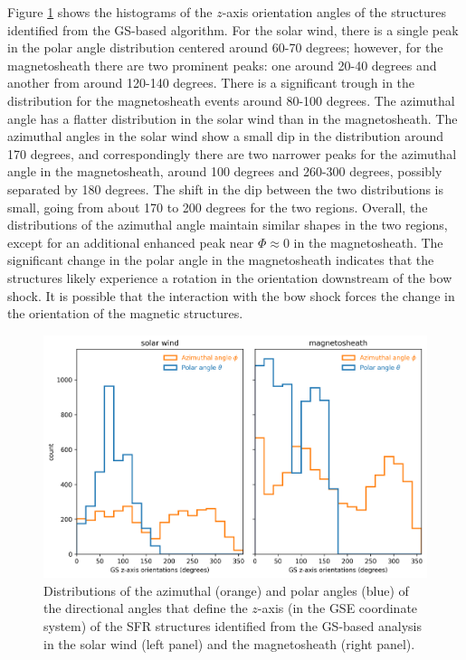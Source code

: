 Figure \ref{fig:histogram-orientation} shows the histograms of the $z$-axis orientation angles of the structures identified from the GS-based algorithm. For the solar wind, there is a single peak in the polar angle distribution centered around 60-70 degrees; however, for the magnetosheath there are two prominent peaks: one around 20-40 degrees and another from around 120-140 degrees. There is a significant trough in the distribution for the magnetosheath events around 80-100 degrees. The azimuthal angle has a flatter distribution in the solar wind than in the magnetosheath. The azimuthal angles in the solar wind show a small dip in the distribution around 170 degrees, and correspondingly there are two narrower peaks for the azimuthal angle in the magnetosheath, around 100 degrees and 260-300 degrees, possibly separated by 180 degrees. The shift in the dip between the two distributions is small, going from about 170 to 200 degrees for the two regions. Overall, the distributions of the azimuthal angle maintain similar shapes in the two regions, except for an additional enhanced peak near $\Phi\approx 0$ in the magnetosheath. The significant change in the polar angle in the magnetosheath indicates that the structures likely experience a rotation in the orientation downstream of the bow shock. It is possible that the interaction with the bow shock forces the change in the orientation of the magnetic structures.

\begin{figure}
    \centering
    \includegraphics[width=\textwidth]{Figures/Histograms/histogram_orientation.png}
    \caption[Distributions of the azimuthal  and polar angles that define the $z$-axis of SFR structures]{Distributions of the azimuthal (orange) and polar angles (blue) of the directional angles that define the $z$-axis (in the GSE coordinate system) of the SFR structures identified from the GS-based analysis in the solar wind (left panel) and the magnetosheath (right panel).}
    \label{fig:histogram-orientation}
\end{figure}
